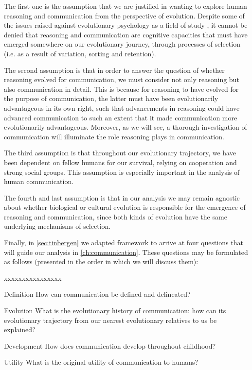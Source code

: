 The first one is the assumption that we are justified in wanting to explore human reasoning and communication from the perspective of evolution. Despite some of the issues raised against evolutionary psychology as a field of study \citep{LB02}, it cannot be denied that reasoning and communication are cognitive capacities that must have emerged somewhere on our evolutionary journey, through processes of selection (i.e. as a result of variation, sorting and retention).

The second assumption is that in order to answer the question of whether reasoning evolved for communication, we must consider not only reasoning but also communication in detail. This is because for reasoning to have evolved for the purpose of communication, the latter must have been evolutionarily advantageous in its own right, such that advancements in reasoning could have advanced communication to such an extent that it made communication more evolutionarily advantageous.
Moreover, as we will see, a thorough investigation of communication will illuminate the role reasoning plays in communication.

The third assumption is that throughout our evolutionary trajectory, we have been dependent on fellow humans for our survival, relying on cooperation and strong social groups. This assumption is especially important in the analysis of human communication.

The fourth and last assumption is that in our analysis we may remain agnostic about whether biological or cultural evolution is responsible for the emergence of reasoning and communication, since both kinds of evolution have the same underlying mechanisms of selection.

Finally, in \cref{sec:tinbergen} we adapted  framework to arrive at four questions that will guide our analysis in \cref{ch:communication}. These questions may be formulated as follows (presented in the order in which we will discuss them):

\begin{labeling}{xxxxxxxxxxxxxxxx}
    \item [Definition] How can communication be defined and delineated?
    \item [Evolution] What is the evolutionary history of communication: how can its evolutionary trajectory from our nearest evolutionary relatives to us be explained?
    \item [Development] How does communication develop throughout childhood?
    \item [Utility] What is the original utility of communication to humans?
\end{labeling}

